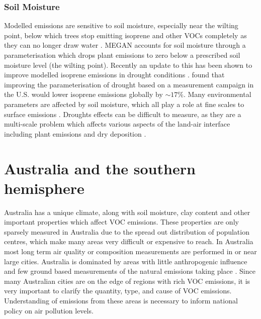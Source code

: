     
    \subsubsection{Soil Moisture}
      \label{LR:Models:Uncert:SoilMoisture}
      Modelled emissions are sensitive to soil moisture, especially near the wilting point, below which trees stop emitting isoprene and other VOCs completely as they can no longer draw water \parencite{Bauwens2016}.
      MEGAN accounts for soil moisture through a parameterisation which drops plant emissions to zero below a prescribed soil moisture level (the wilting point).
      Recently an update to this has been shown to improve modelled isoprene emissions in drought conditions \parencite{Jiang2018}.
      \textcite{Jiang2018} found that improving the parameterisation of drought based on a measurement campaign in the U.S. would lower isoprene emissions globally by $\sim17\%$.
      Many environmental parameters are affected by soil moisture, which all play a role at fine scales to surface emissions \parencite{Rowntree1983,Chen2001}.
      Droughts effects can be difficult to measure, as they are a multi-scale problem which affects various aspects of the land-air interface including plant emissions and dry deposition \parencite{Wang2017}.
      

\section{Australia and the southern hemisphere}
\label{LR:Aus}
  
  Australia has a unique climate, along with soil moisture, clay content and other important properties which affect VOC emissions.
  These properties are only sparsely measured in Australia due to the spread out distribution of population centres, which make many areas very difficult or expensive to reach.
  In Australia most long term air quality or composition measurements are performed in or near large cities.
  Australia is dominated by areas with little anthropogenic influence and few ground based measurements of the natural emissions taking place \parencite{VanDerA2008}.
  Since many Australian cities are on the edge of regions with rich VOC emissions, it is very important to clarify the quantity, type, and cause of VOC emissions.
  Understanding of emissions from these areas is necessary to inform national policy on air pollution levels.
  

